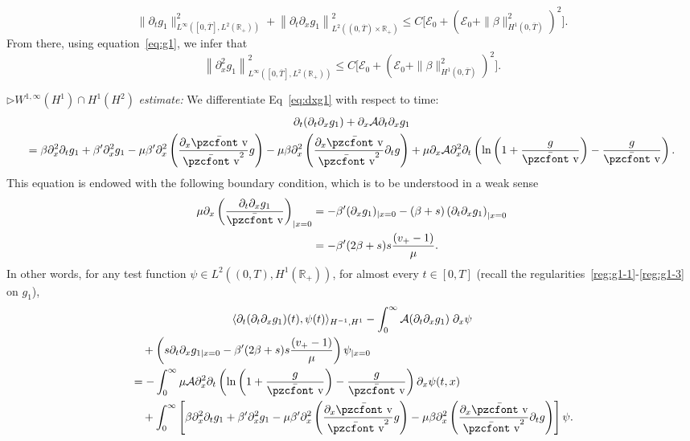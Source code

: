 \documentclass[10pt]{amsart}
\theoremstyle{definition}\newtheorem{defi}[theo]{Definition}\newtheorem{rema}[theo]{Remark}\newtheorem{exam}[theo]{Example}\newtheorem{exem}[theo]{Example}\newtheorem{nota}[theo]{Notation}
\newcommand{\mathpzc}[1]{\text{\pzcfont #1}}
\newcommand{\R}{\mathbb{R}}
\newcommand{\p}{\partial}
\newcommand{\bv}{\bar{\mathpzc{v}}}
\newcommand{\cA}{\mathcal A}
\newcommand{\cE}{\mathcal E}
\begin{document}
\begin{equation}
\|\partial_t g_1\|_{L^\infty\left([0, \overline{T}], L^2(\R_+)\right)}^2 + \left\|\partial_t \partial_x g_1\right\|_{L^2\left((0,\overline{T}) \times \R_+\right)}^2
\leq C \Big[\cE_0 + \left(\cE_0 +\|\beta\|_{H^1\left(0,\overline{T}\right)}^2\right)^2 \Big].
\end{equation}
From there, using equation~\eqref{eq:g1}, we infer that
\[
\left\|\p_x^2 g_1\right\|_{L^\infty\left([0, \overline{T}], L^2(\R_+)\right)}^2\leq C \Big[\cE_0 + \left(\cE_0 +\|\beta\|_{H^1\left(0,\overline{T}\right)}^2\right)^2 \Big].
\]



$\rhd W^{1,\infty}(H^1)\cap H^1(H^2)$ \emph{estimate:} We differentiate Eq~\eqref{eq:dxg1} with respect to time:
\begin{multline}\label{eq:dtdx-g1}
\partial_t (\partial_t \partial_x g_1) + \partial_x \cA \partial_t \partial_x g_1 \\
 = \beta \partial^2_x \partial_t g_1 + \beta'\partial^2_x g_1 - \mu \beta' \partial^2_x \left(\dfrac{\partial_x \bv}{\bv^2} g\right)
- \mu \beta \partial^2_x \left(\dfrac{\partial_x \bv}{\bv^2} \partial_t g\right) + \mu \partial_x \cA \partial_x^2 \partial_t \left(\ln \left(1+ \dfrac{g}{\bv}\right) - \dfrac{g}{\bv} \right).
\end{multline}
This equation is endowed with the following boundary condition, which is to be understood in a weak sense
\begin{equation}\label{BC:px2g1-0}
\begin{aligned}
\mu \partial_x \left(\dfrac{\partial_t\partial_x g_1}{\bv}\right)_{|x=0} & = -\beta'(\partial_x g_1)_{|x=0} - (\beta+s) \left(\partial_t \partial_x g_1\right)_{|x=0}  \\
& = - \beta'(2\beta +s)s \dfrac{(v_+-1)}{\mu}.
\end{aligned}
\end{equation}
In other words, for any test function $\psi\in L^2((0,T), H^1(\R_+))$, for almost every $t\in [0,T]$ (recall the regularities~\eqref{reg:g1-1}-\eqref{reg:g1-3} on $g_1$),
\begin{multline}\label{weak-dtdxg1}
\langle \p_t (\p_t\p_x g_1)(t), \psi(t)\rangle_{H^{-1}, H^1} -\int_0^\infty \cA(\p_t\p_x g_1)\; \p_x \psi \\
\begin{aligned}
&\quad+\left(s\p_t\p_x g_{1|x=0} - \beta'(2\beta +s)s \dfrac{(v_+-1)}{\mu}\right)\psi_{|x=0}\\
&=-\int_0^\infty \mu \cA \p_x^2 \p_t \left(\ln \left(1+ \dfrac{g}{\bv}\right) - \dfrac{g}{\bv} \right) \p_x \psi(t,x) \\
&\quad +\int_0^\infty \left[\beta \p_x^2\p_t g_1 + \beta'\partial^2_x g_1 - \mu \beta' \partial^2_x \left(\dfrac{\partial_x \bv}{\bv^2} g\right) - \mu \beta \partial^2_x \left(\dfrac{\partial_x \bv}{\bv^2} \partial_t g\right) \right] \psi.
\end{aligned}
\end{multline}
\end{document}
